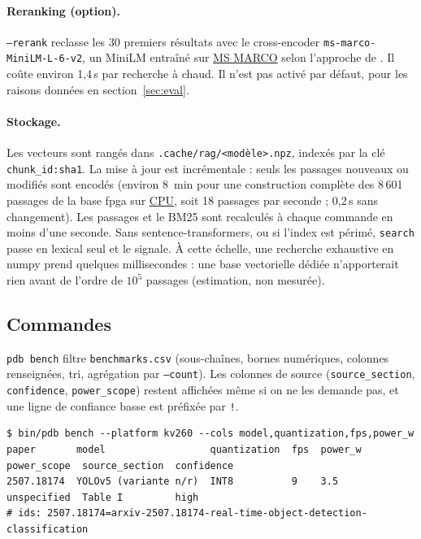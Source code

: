 \documentclass[11pt,a4paper]{article}
\newcommand{\cmd}[1]{\texttt{#1}}
\newcommand{\gl}[2]{\hyperlink{gl:#1}{\textcolor{glcolor}{#2}}}
\begin{document}
\paragraph{Reranking (option).} \cmd{--rerank} reclasse les 30 premiers résultats avec le
cross-encoder \cmd{ms-marco-MiniLM-L-6-v2}, un MiniLM \citep{wang2020minilm} entraîné sur
\gl{MSMARCO}{MS MARCO} \citep{nguyen2016msmarco} selon l'approche de \citet{nogueira2019rerank}. Il
coûte environ 1,4\,s par recherche à chaud. Il n'est pas activé par défaut, pour les raisons
données en section~\ref{sec:eval}.

\paragraph{Stockage.} Les vecteurs sont rangés dans \cmd{.cache/rag/<modèle>.npz}, indexés
par la clé \cmd{chunk\_id:sha1}. La mise à jour est incrémentale : seuls les passages
nouveaux ou modifiés sont encodés (environ 8~min pour une construction complète des
8\,601 passages de la base fpga sur \gl{CPU}{CPU}, soit 18 passages par seconde ; 0,2\,s sans
changement). Les passages et le BM25 sont recalculés à chaque commande en
moins d'une seconde. Sans sentence-transformers, ou si l'index est périmé, \cmd{search}
passe en lexical seul et le signale. À cette échelle, une recherche exhaustive en numpy
prend quelques millisecondes : une base vectorielle dédiée n'apporterait rien avant de
l'ordre de $10^5$ passages (estimation, non mesurée).

\subsection{Commandes}

\cmd{pdb bench} filtre \cmd{benchmarks.csv} (sous-chaînes, bornes numériques, colonnes
renseignées, tri, agrégation par \cmd{--count}). Les colonnes de source (\cmd{source\_section},
\cmd{confidence}, \cmd{power\_scope}) restent affichées même si on ne les demande pas, et une
ligne de confiance basse est préfixée par \cmd{!}.

\begin{lstlisting}
$ bin/pdb bench --platform kv260 --cols model,quantization,fps,power_w
paper       model                  quantization  fps  power_w  power_scope  source_section  confidence
2507.18174  YOLOv5 (variante n/r)  INT8          9    3.5      unspecified  Table I         high
# ids: 2507.18174=arxiv-2507.18174-real-time-object-detection-classification
\end{lstlisting}
\end{document}
